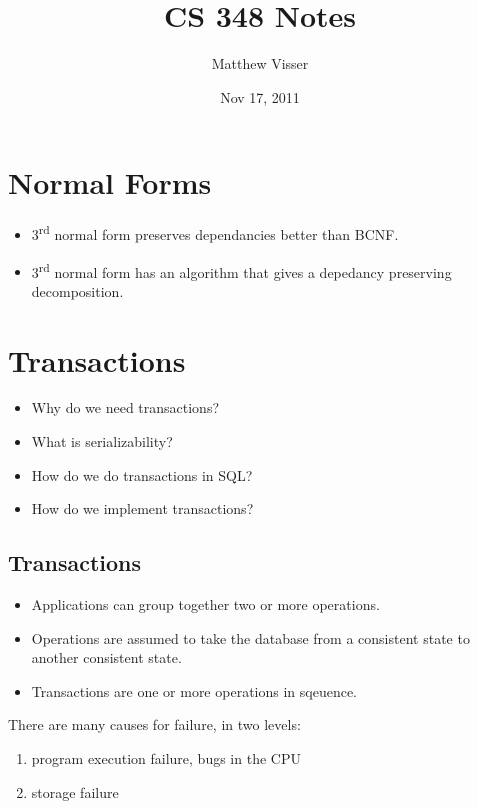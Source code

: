 \documentclass[12pt]{article}
\begin{document}
\title{CS 348 Notes}
\author{Matthew Visser}
\date{Nov 17, 2011}
\maketitle

\section{Normal Forms}

\begin{itemize}
	\item 3\textsuperscript{rd} normal form preserves dependancies better than
		BCNF.
	\item 3\textsuperscript{rd} normal form has an algorithm that gives a
		depedancy preserving decomposition.
\end{itemize}
\section{Transactions}

\begin{itemize}
	\item Why do we need transactions?
	\item What is serializability?
	\item How do we do transactions in SQL?
	\item How do we implement transactions?
\end{itemize}

\subsection{Transactions}

\begin{itemize}
	\item Applications can group together two or more operations.
	\item Operations are assumed to take the database from a consistent state
		to another consistent state.
	\item Transactions are one or more operations in sqeuence.
\end{itemize}

There are many causes for failure, in two levels:
\begin{enumerate}
	\item program execution failure, bugs in the CPU
	\item storage failure
\end{enumerate}
\end{document}
